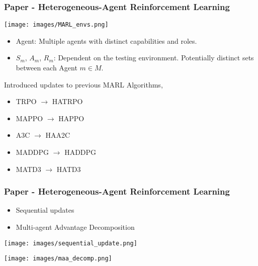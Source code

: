\documentclass{beamer}
\begin{document}
\begin{frame}
    \frametitle{Paper \thepapercounter - Heterogeneous-Agent Reinforcement Learning%
    }
    \begin{description} \small
        \item[Environments:]
    \end{description}
        \texttt{[image: images/MARL\_envs.png]}
    \begin{description}\small
        \item[Model:]
        \begin{itemize} \small
            \item Agent: Multiple agents with distinct capabilities and roles.
            \item $S_m$, $A_m$, $R_m$: Dependent on the testing environment.
            Potentially distinct sets between each Agent $m\in M$.
        \end{itemize}
        \item[Algorithms:] Introduced updates to previous MARL Algorithms, \vspace*{-1em}
        \begin{multicols*}{2}
            \begin{itemize} \small
                \item TRPO\cite{schulman2017} $\rightarrow$ HATRPO
                \item MAPPO\cite{yu2022} $\rightarrow$ HAPPO
                \item A3C\cite{mnih2016} $\rightarrow$ HAA2C
                \item MADDPG\cite{lowe2020} $\rightarrow$ HADDPG
                \item MATD3\cite{ackermann2019} $\rightarrow$ HATD3
            \end{itemize}
        \end{multicols*}
    \end{description}
\end{frame}

\begin{frame}
    \frametitle{Paper \thepapercounter - Heterogeneous-Agent Reinforcement Learning~
    \cite{zhong2024}}
    \begin{multicols}{2}
        \begin{description} \small
            \item[Algorithms:]
            \begin{itemize}
                \item Sequential updates
                \item Multi-agent Advantage Decomposition 
            \end{itemize}
            \vfill\phantom{}
        \end{description}
        \texttt{[image: images/sequential\_update.png]}
    \end{multicols}
    \centering
    \texttt{[image: images/maa\_decomp.png]}
\end{frame}
\end{document}
